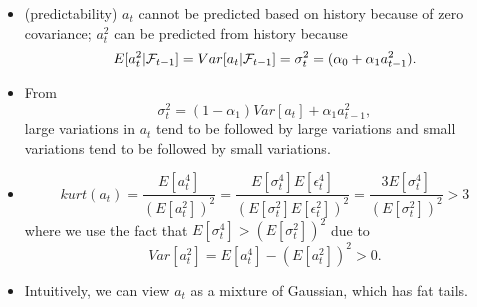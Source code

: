 \begin{remark}[interpretation]\cite[116]{tsay2005analysis}\hfill
\begin{itemize}
	\item (predictability) $a_t$ cannot be predicted based on history because of zero covariance; $a_t^2$ can be predicted from history because 
	$$E[a_t^2|\mathcal{F}_{t-1}] = Var[a_t|\mathcal{F}_{t-1}] = \sigma_t^2 = (\alpha_0 + \alpha_1 a_{t-1}^2). $$
	\item From $$\sigma_t^2 = (1-\alpha_1)Var[a_t] + \alpha_1 a_{t-1}^2,$$
	large variations in $a_t$ tend to be followed by large variations and small variations tend to be followed by small variations.
	\item $$kurt(a_t) = \frac{E[a_t^4]}{(E[a_t^2])^2} = \frac{E[\sigma_t^4]E[\epsilon_t^4]}{(E[\sigma_t^2]E[\epsilon_t^2])^2} = \frac{3E[\sigma_t^4]}{(E[\sigma_t^2])^2} > 3$$
	where we use the fact that $E[\sigma_t^4] > (E[\sigma_t^2])^2$ due to
	$$Var[a_t^2] = E[a_t^4] - (E[a_t^2])^2 > 0.$$
	\item  Intuitively, we can view $a_t$ as a mixture of Gaussian, which has fat tails.
\end{itemize}	
\end{remark}



